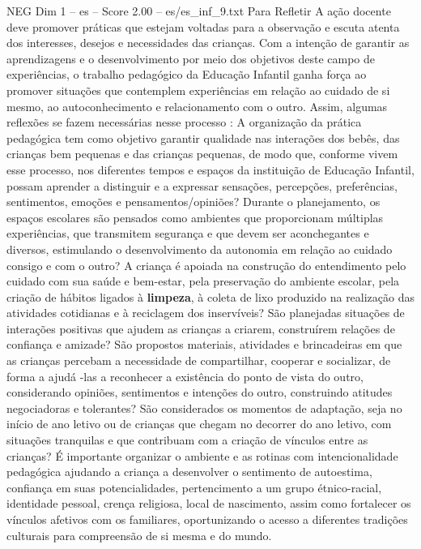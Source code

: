 \begin{textsample}{NEG Dim 1 – es – Score 2.00 – es/es\_inf\_9.txt}  \label{ex:f1_neg_092}
Para Refletir A ação docente deve promover práticas que estejam voltadas para a observação e escuta atenta dos interesses, desejos e necessidades das crianças.
Com a intenção de garantir as aprendizagens e o desenvolvimento por meio dos objetivos deste campo de experiências, o trabalho pedagógico da Educação Infantil ganha força ao promover situações que contemplem experiências em relação ao cuidado de si mesmo, ao autoconhecimento e relacionamento com o outro.
Assim, algumas reflexões se fazem necessárias nesse processo : A organização da prática pedagógica tem como objetivo garantir qualidade nas interações dos bebês, das crianças bem pequenas e das crianças pequenas, de modo que, conforme vivem esse processo, nos diferentes tempos e espaços da instituição de Educação Infantil, possam aprender a distinguir e a expressar sensações, percepções, preferências, sentimentos, emoções e pensamentos/opiniões?
Durante o planejamento, os espaços escolares são pensados como ambientes que proporcionam múltiplas experiências, que transmitem segurança e que devem ser aconchegantes e diversos, estimulando o desenvolvimento da autonomia em relação ao cuidado consigo e com o outro?
A criança é apoiada na construção do entendimento pelo cuidado com sua saúde e bem-estar, pela preservação do ambiente escolar, pela criação de hábitos ligados à \textbf{limpeza}, à coleta de lixo produzido na realização das atividades cotidianas e à reciclagem dos inservíveis?
São planejadas situações de interações positivas que ajudem as crianças a criarem, construírem relações de confiança e amizade?
São propostos materiais, atividades e brincadeiras em que as crianças percebam a necessidade de compartilhar, cooperar e socializar, de forma a ajudá -las a reconhecer a existência do ponto de vista do outro, considerando opiniões, sentimentos e intenções do outro, construindo atitudes negociadoras e tolerantes?
São considerados os momentos de adaptação, seja no início de ano letivo ou de crianças que chegam no decorrer do ano letivo, com situações tranquilas e que contribuam com a criação de vínculos entre as crianças?
É importante organizar o ambiente e as rotinas com intencionalidade pedagógica ajudando a criança a desenvolver o sentimento de autoestima, confiança em suas potencialidades, pertencimento a um grupo étnico-racial, identidade pessoal, crença religiosa, local de nascimento, assim como fortalecer os vínculos afetivos com os familiares, oportunizando o acesso a diferentes tradições culturais para compreensão de si mesma e do mundo.

\end{textsample}
